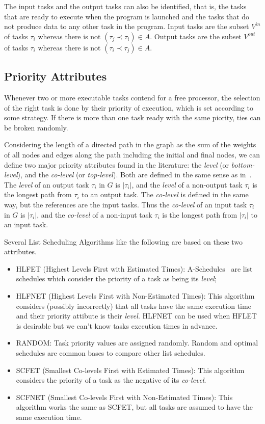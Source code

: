 \documentclass[twocolumn]{svjour3}
\begin{document}
The input tasks and the output tasks can also be identified, that is, the tasks that are ready to execute when the program is launched and the tasks that do not produce data to any other task in the program. Input tasks are the subset $V^{in}$ of tasks $\tau_i$ whereas there is not $(\tau_j \prec \tau_i) \in A$. Output tasks are the subset $V^{out}$ of tasks $\tau_i$ whereas there is not $(\tau_i \prec \tau_j) \in A$.

\subsection{Priority Attributes}
\label{sub:priority_attributes}

Whenever two or more executable tasks contend for a free processor, the selection of the right task is done by their priority of execution, which is set according to some strategy. If there is more than one task ready with the same piority, ties can be broken randomly.

Considering the length of a directed path in the graph as the sum of the weights of all {\color{blue}nodes} and edges along the path including the initial and final {\color{blue}nodes}, we can define two major priority attributes found in the literature: the \emph{level} (or \emph{bottom-level}), and the \emph{co-level} (or \emph{top-level}). Both are defined in the same sense as in~\cite{coffman1973operating}. The \emph{level} of an output task $\tau_i$ in $G$ is $|\tau_i|$, and the \emph{level} of a non-output task $\tau_i$ is the longest path from $\tau_i$ to an output task. The \emph{co-level} is defined in the same way, but the references are the input tasks. Thus the \emph{co-level} of an input task $\tau_i$ in $G$ is $|\tau_i|$, and the \emph{co-level} of a non-input task $\tau_i$ is the longest path from $|\tau_i|$ to an input task.

Several List Scheduling Algorithms like the following are based {\color{blue}on these} two attributes.
\begin{itemize}
	\item HLFET (Highest Levels First with Estimated Times): A-Schedules~\cite{coffman1973operating} are list schedules which consider the priority of a task as being its \emph{level};
	\item HLFNET (Highest Levels First with {\color{blue}Non-}Estimated Times): This algorithm considers (possibly incorrectly) that all tasks have the same execution time and their priority attibute is their \emph{level}. HLFNET can be used when HFLET is desirable but we can't know tasks execution times in advance.
	\item RANDOM: Task priority values are assigned randomly. Random and optimal schedules are common bases to compare other list schedules.
	\item SCFET (Smallest Co-levels First with Estimated Times): This algorithm considers the priority of a task as the negative of its \emph{co-level}.
	\item SCFNET (Smallest Co-levels First with {\color{blue}Non-}Estimated Times): This algorithm works the same as SCFET, but all tasks are assumed to have the same execution time.
\end{itemize}
\end{document}
